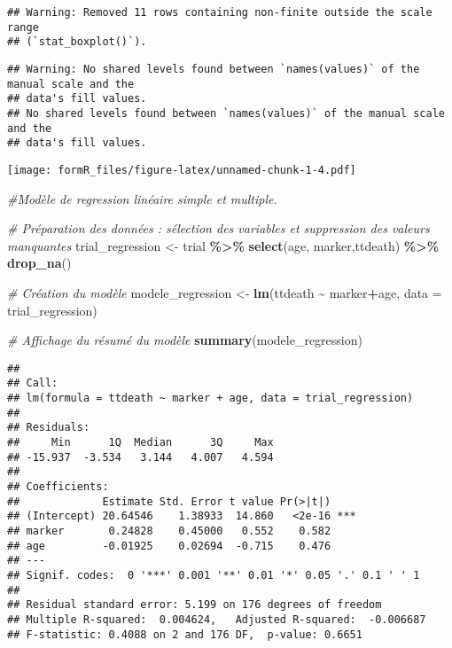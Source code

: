 \documentclass[
]{article}
\newenvironment{Shaded}{\begin{snugshade}}{\end{snugshade}}
\newcommand{\AttributeTok}[1]{\textcolor[rgb]{0.13,0.29,0.53}{#1}}
\newcommand{\CommentTok}[1]{\textcolor[rgb]{0.56,0.35,0.01}{\textit{#1}}}
\newcommand{\FunctionTok}[1]{\textcolor[rgb]{0.13,0.29,0.53}{\textbf{#1}}}
\newcommand{\NormalTok}[1]{#1}
\newcommand{\OtherTok}[1]{\textcolor[rgb]{0.56,0.35,0.01}{#1}}
\newcommand{\SpecialCharTok}[1]{\textcolor[rgb]{0.81,0.36,0.00}{\textbf{#1}}}
\begin{document}
\begin{verbatim}
## Warning: Removed 11 rows containing non-finite outside the scale range
## (`stat_boxplot()`).
\end{verbatim}

\begin{verbatim}
## Warning: No shared levels found between `names(values)` of the manual scale and the
## data's fill values.
## No shared levels found between `names(values)` of the manual scale and the
## data's fill values.
\end{verbatim}

\texttt{[image: formR\_files/figure-latex/unnamed-chunk-1-4.pdf]}

\begin{Shaded}
\begin{Highlighting}[]
\CommentTok{\#Modèle de regression linéaire simple et multiple.}


\CommentTok{\# Préparation des données : sélection des variables et suppression des valeurs manquantes}
\NormalTok{trial\_regression }\OtherTok{\textless{}{-}}\NormalTok{ trial }\SpecialCharTok{\%\textgreater{}\%}
  \FunctionTok{select}\NormalTok{(age, marker,ttdeath) }\SpecialCharTok{\%\textgreater{}\%}
  \FunctionTok{drop\_na}\NormalTok{()}

\CommentTok{\# Création du modèle}
\NormalTok{modele\_regression }\OtherTok{\textless{}{-}} \FunctionTok{lm}\NormalTok{(ttdeath }\SpecialCharTok{\textasciitilde{}}\NormalTok{ marker}\SpecialCharTok{+}\NormalTok{age, }\AttributeTok{data =}\NormalTok{ trial\_regression)}

\CommentTok{\# Affichage du résumé du modèle}
\FunctionTok{summary}\NormalTok{(modele\_regression)}
\end{Highlighting}
\end{Shaded}

\begin{verbatim}
## 
## Call:
## lm(formula = ttdeath ~ marker + age, data = trial_regression)
## 
## Residuals:
##     Min      1Q  Median      3Q     Max 
## -15.937  -3.534   3.144   4.007   4.594 
## 
## Coefficients:
##             Estimate Std. Error t value Pr(>|t|)    
## (Intercept) 20.64546    1.38933  14.860   <2e-16 ***
## marker       0.24828    0.45000   0.552    0.582    
## age         -0.01925    0.02694  -0.715    0.476    
## ---
## Signif. codes:  0 '***' 0.001 '**' 0.01 '*' 0.05 '.' 0.1 ' ' 1
## 
## Residual standard error: 5.199 on 176 degrees of freedom
## Multiple R-squared:  0.004624,   Adjusted R-squared:  -0.006687 
## F-statistic: 0.4088 on 2 and 176 DF,  p-value: 0.6651
\end{verbatim}
\end{document}
